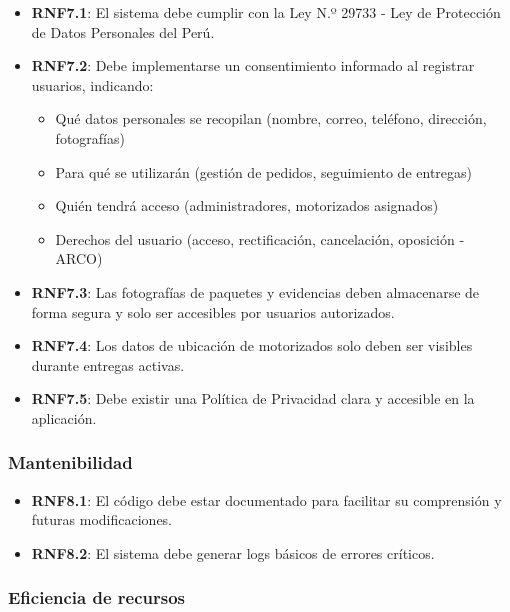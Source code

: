 \begin{itemize}
    \item \textbf{RNF7.1}: El sistema debe cumplir con la Ley N.º 29733 - Ley de Protección de Datos Personales del Perú.
    
    \item \textbf{RNF7.2}: Debe implementarse un consentimiento informado al registrar usuarios, indicando:
    \begin{itemize}
        \item Qué datos personales se recopilan (nombre, correo, teléfono, dirección, fotografías)
        \item Para qué se utilizarán (gestión de pedidos, seguimiento de entregas)
        \item Quién tendrá acceso (administradores, motorizados asignados)
        \item Derechos del usuario (acceso, rectificación, cancelación, oposición - ARCO)
    \end{itemize}
    
    \item \textbf{RNF7.3}: Las fotografías de paquetes y evidencias deben almacenarse de forma segura y solo ser accesibles por usuarios autorizados.
    
    \item \textbf{RNF7.4}: Los datos de ubicación de motorizados solo deben ser visibles durante entregas activas.
    
    \item \textbf{RNF7.5}: Debe existir una Política de Privacidad clara y accesible en la aplicación.
\end{itemize}

\subsubsection{Mantenibilidad}

\begin{itemize}
    \item \textbf{RNF8.1}: El código debe estar documentado para facilitar su comprensión y futuras modificaciones.
    \item \textbf{RNF8.2}: El sistema debe generar logs básicos de errores críticos.
\end{itemize}

\subsubsection{Eficiencia de recursos}

